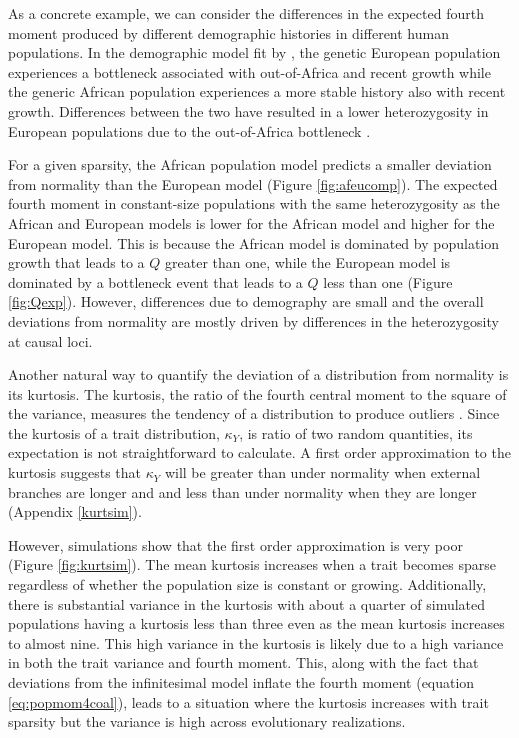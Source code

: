 As a concrete example, we can consider the differences in the expected fourth
moment produced by different demographic histories in different human
populations. In the demographic model fit by \citet{Tennessen2012}, the genetic
European population experiences a bottleneck associated with out-of-Africa and
recent growth while the generic African population experiences a more stable
history also with recent growth. Differences between the two have resulted in a
lower heterozygosity in European populations due to the out-of-Africa
bottleneck \citep{Yu2002}.

For a given sparsity, the African population model predicts a smaller deviation
from normality than the European model (Figure \ref{fig:afeucomp}). The expected
fourth moment in constant-size populations with the same heterozygosity as the
African and European models is lower for the African model and higher for the
European model. This is because the African model is dominated by population
growth that leads to a $Q$ greater than one, while the European model is
dominated by a bottleneck event that leads to a $Q$ less than one
(Figure \ref{fig:Qexp}). However, differences due to demography are small and
the overall deviations from normality are mostly driven by differences in the
heterozygosity at causal loci.

Another natural way to quantify the deviation of a distribution from normality
is its kurtosis. The kurtosis, the ratio of the fourth central moment to the
square of the variance, measures the tendency of a distribution to produce
outliers \citep{Westfall2014}. Since the kurtosis of a trait distribution,
$\kappa_Y$, is ratio of two random quantities, its expectation is not
straightforward to calculate. A first order approximation to the kurtosis
suggests that $\kappa_Y$ will be greater than under normality when external
branches are longer and and less than under normality when they are longer
(Appendix \ref{kurtsim}).

However, simulations show that the first order approximation is very poor
(Figure \ref{fig:kurtsim}). The mean kurtosis increases when a trait becomes
sparse regardless of whether the population size is constant or growing.
Additionally, there is substantial variance in the kurtosis with about a quarter
of simulated populations having a kurtosis less than three even as the mean
kurtosis increases to almost nine. This high variance in the kurtosis is likely
due to a high variance in both the trait variance and fourth moment. This, along
with the fact that deviations from the infinitesimal model inflate the fourth
moment (equation \eqref{eq:popmom4coal}), leads to a situation where the
kurtosis increases with trait sparsity but the variance is high across
evolutionary realizations.

